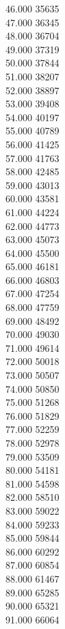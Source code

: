 { 46.000	35635 \\
 47.000	36345 \\
 48.000	36704 \\
 49.000	37319 \\
 50.000	37844 \\
 51.000	38207 \\
 52.000	38897 \\
 53.000	39408 \\
 54.000	40197 \\
 55.000	40789 \\
 56.000	41425 \\
 57.000	41763 \\
 58.000	42485 \\
 59.000	43013 \\
 60.000	43581 \\
 61.000	44224 \\
 62.000	44773 \\
 63.000	45073 \\
 64.000	45500 \\
 65.000	46181 \\
 66.000	46803 \\
 67.000	47254 \\
 68.000	47759 \\
 69.000	48492 \\
 70.000	49030 \\
 71.000	49614 \\
 72.000	50018 \\
 73.000	50507 \\
 74.000	50850 \\
 75.000	51268 \\
 76.000	51829 \\
 77.000	52259 \\
 78.000	52978 \\
 79.000	53509 \\
 80.000	54181 \\
 81.000	54598 \\
 82.000	58510 \\
 83.000	59022 \\
 84.000	59233 \\
 85.000	59844 \\
 86.000	60292 \\
 87.000	60854 \\
 88.000	61467 \\
 89.000	65285 \\
 90.000	65321 \\
 91.000	66064 \\
}
